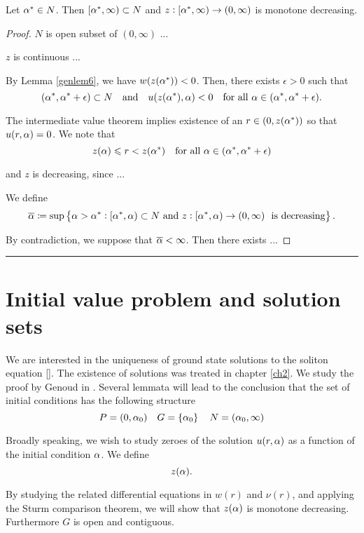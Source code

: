 \begin{lemma}\label{genlem8}
Let $\alpha^{*} \in N$. Then $\left[ \alpha^{*}, \infty \right) \subset N$ and $z : \left[
\alpha^{*}, \infty \right) \to (0, \infty)$ is monotone decreasing.
\end{lemma}
\begin{proof}
$N$ is open subset of $(0, \infty)$ ...

$z$ is continuous ...

By Lemma \ref{genlem6}, we have $w(z(\alpha^{*})) < 0$. Then, there exists $\epsilon >
0$ such that
\[ (\alpha^{*}, \alpha^{*} + \epsilon) \subset N\quad\text{and}\quad u(z(\alpha^{*}), \alpha) < 0\quad
\text{for all} ~ \alpha \in (\alpha^{*}, \alpha^{*} + \epsilon). \]

The intermediate value theorem implies existence of an $r \in (0, z(\alpha^{*}))$ so
that $u(r, \alpha) = 0$. We note that 
\[ z(\alpha) \leqslant r < z(\alpha^{*})\quad\text{for all} ~ \alpha \in (\alpha^{*}, \alpha^{*} + \epsilon) \]

and $z$ is decreasing, since ...

We define
\[ \overline{\alpha} \coloneqq \sup \left\{ \alpha > \alpha^{*} : \left[ \alpha^{*}, \alpha \right) \subset N ~
\text{and} ~ z : \left[ \alpha^{*}, \alpha \right) \to (0, \infty) ~ \text{ is decreasing}
\right\}. \]


By contradiction, we suppose that $\overline{\alpha} < \infty$. Then there exists ...
\end{proof}

\hrule
\section{Initial value problem and solution sets}
We are interested in the uniqueness of ground state solutions to the soliton
equation \eqref{}. The existence of solutions was treated in chapter \ref{ch2}.
We study the proof by Genoud in \cite{gen11}. Several lemmata will lead to the
conclusion that the set of initial conditions has the following structure
\[ P=(0,\alpha_0)\quad G=\left\{\alpha_0\right\}\quad N=(\alpha_0,\infty) \]

Broadly speaking, we wish to study zeroes of the solution $u(r,\alpha)$ as a
function of the initial condition $\alpha$. {\red We define}
\[ z(\alpha). \]

By studying the related differential equations in $w(r)$ and $\nu(r)$, and
applying the Sturm comparison theorem, we will show that $z(\alpha)$ is
monotone decreasing. Furthermore {\red $G$ is open and contiguous}.

